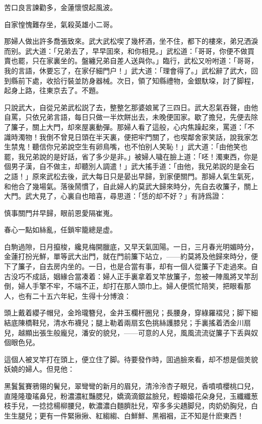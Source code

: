 苦口良言諫勸多，金蓮懷恨起風波。

自家惶愧難存坐，氣殺英雄小二哥。

那婦人做出許多喬張致來。武大武松喫了幾杯酒，坐不住，都下的樓來，弟兄洒淚而别。武大道：「兄弟去了，早早囬來，和你相見。」武松道：「哥哥，你便不做買賣也罷，只在家裏坐的。盤纏兄弟自差人送與你。」臨行，武松又吩咐道：「哥哥，我的言語，休要忘了，在家仔細門户！」武大道：「理會得了。」武松辭了武大，回到縣前下處，收拾行裝並防身器械。次日，領了知縣禮物，金銀馱垜，討了脚程，起身上路，往東京去了。不題。

只說武大，自從兄弟武松説了去，整整乞那婆娘駡了三四日。武大忍氣吞聲，由他自罵，只依兄弟言語，每日只做一半炊餅出去，未晚便囬家。歇了擔兒，先便去除了簾子，關上大門，却來屋裏動彈。那婦人看了這般，心内焦躁起來，罵道：「不識時濁物！我倒不曾見日頭在半天裏，便把牢門關了，也喫鄰舍家笑話，說我家怎生禁鬼！聽信你兄弟說空生有卵鳥嘴，也不怕别人笑恥！」武大道：「由他笑也罷，我兄弟說的是好話，省了多少是非。」被婦人噦在臉上道：「呸！濁東西，你是個男子漢，自不做主，却聽別人調遣！」武大搖手道：「由他，我兄弟説的是金石之語！」原來武松去後，武大每日只是晏出早歸，到家便關門。那婦人氣生氣死，和他合了幾場氣。落後鬧慣了，自此婦人約莫武大歸來時分，先自去收簾子，關上大門。武大見了，心裏自也暗喜，尋思道：「恁的却不好？」有詩爲證：

慎事關門幷早歸，眼前恩愛隔崔嵬。

春心一點如絲亂，任鎖牢籠總是虚。

白駒過隙，日月攛梭，纔見梅開臘底，又早天氣囬陽。一日，三月春光明媚時分，金蓮打扮光鮮，單等武大出門，就在門前簾下站立，——約莫將及他歸來時分，便下了簾子，自去房内坐的。一日，也是合當有事，却有一個人從簾子下走過來。自古没巧不成話，姻緣合當凑着：婦人正手裏拿着叉竿放簾子，忽被一陣風將叉竿刮倒，婦人手擎不牢，不端不正，却打在那人頭巾上。婦人便慌忙陪笑，把眼看那人，也有二十五六年紀，生得十分博浪：

頭上戴着纓子帽兒，金玲瓏簪兒，金井玉欄杆圈兒；長腰身，穿綠羅褶兒；脚下細結底陳橋鞋兒，清水布襪兒；腿上勒着兩扇玄色挑絲護膝兒；手裏搖着洒金川扇兒，越顯出張生般龐兒，潘安的貌兒，——可意的人兒，風風流流従簾子下丢與奴個眼色兒。

這個人被叉竿打在頭上，便立住了脚。待要發作時，囬過臉來看，却不想是個羙貌妖嬈的婦人。但見他：

黑鬒鬒賽鴉翎的鬢兒，翠彎彎的新月的眉兒，清泠泠杏子眼兒，香噴噴櫻桃口兒，直隆隆瓊瑤鼻兒，粉濃濃紅豔腮兒，嬌滴滴銀盆臉兒，輕嬝嬝花朵身兒，玉纖纖葱枝手兒，一捻捻楊柳腰兒，軟濃濃白麵臍肚兒，窄多多尖趫脚兒，肉奶奶胸兒，白生生腿兒；更有一件緊揪揪、紅縐縐、白鮮鮮、黑裀裀，正不知是什麽東西！

